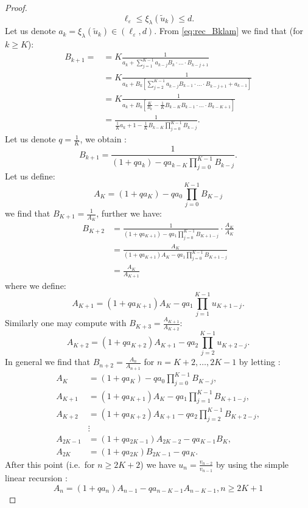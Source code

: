 \documentclass[12pt]{report}
\begin{document}
\begin{proof}
$$
\ell_\varepsilon \leq \xi_\lambda(\tilde u_k) \leq d.
$$
Let us denote $a_k=\xi_\lambda(\tilde{u}_k) \in (\ell_\varepsilon, d)$.
From \eqref{eq:rec_Bklam} we find that (for $k \geq K$):
\begin{align*}
B_{k+1}=
&=K \frac{1}{a_k + \sum_{j=1}^{K-1} a_{k-j} B_k \cdot \dots \cdot B_{k-j+1}}\\
&=K \frac{1}{a_k + B_k \left[ \sum_{j=2}^{K-1} a_{k-j} B_{k-1} \cdot \dots \cdot B_{k-j+1} + a_{k-1} \right]}\\
&=K \frac{1}{a_k + B_k \left[ \frac{K}{B_k} - \frac{1}{K} B_{k-K} B_{k-1} \cdot \dots \cdot B_{k-K+1} \right]}\\
&= \frac{1}{\frac{1}{K} a_k + 1 - \frac{1}{K} B_{k-K} \prod_{j=0}^{K-1} B_{k-j}}.
\end{align*}
Let us denote $q=\frac{1}{K}$, we obtain :
$$
B_{k+1} = \frac{1}{(1+q a_k) - q a_{k-K} \prod_{j=0}^{K-1} B_{k-j}}.
$$
Let us define: 
$$
A_K = (1+qa_K) - q a_0 \prod_{j=0}^{K-1} B_{K-j}
$$
we find that $B_{K+1} = \frac{1}{A_K}$, further we have:
\begin{align*}
B_{K+2}
&= \frac{1}{(1+q a_{K+1}) - qa_1 \prod_{j=0}^{K-1} B_{K+1-j}} \cdot \frac{A_K}{A_K}\\
&=\frac{A_K}{(1+q a_{K+1}) A_K - q a_1 \prod_{j=0}^{K-1} B_{K+1-j}}\\
&= \frac{A_K}{A_{K+1}}
\end{align*}
where we define:
$$
A_{K+1} = (1+q a_{K+1}) A_K - q a_1 \prod_{j=1}^{K-1} u_{K+1-j}.
$$
Similarly one may compute with $B_{K+3} = \frac{A_{K+1}}{A_{K+2}}$:
$$
A_{K+2}=(1+qa_{K+2})A_{K+1} - qa_2 \prod_{j=2}^{K-1} u_{K+2-j}.
$$
In general we find that $B_{n+2} = \frac{A_n}{A_{n+1}}$ for $n=K+2,\ldots, 2K-1$ by letting :
\begin{align*}
A_K  &= (1+q a_K) - q a_0 \prod_{j=0}^{K-1} B_{K-j},\\
A_{K+1} &= (1+qa_{K+1}) A_K - q a_1 \prod_{j=1}^{K-1} B_{K+1-j}, \\
A_{K+2} &= (1+qa_{K+2}) A_{K+1} - qa_2 \prod_{j=2}^{K-1} B_{K+2-j}, \\
& \vdots \\
A_{2K-1} &= (1+q a_{2K-1}) A_{2K-2} - q a_{K-1} B_K,\\
A_{2K} &= (1+qa_{2K}) B_{2K-1} - q a_K.
\end{align*}
After this point (i.e.~for $n \geq 2K+2$) we have $u_n = \frac{v_{n-2}}{v_{n-1}}$ by using the simple linear recursion :
\begin{equation}\label{eq:rec_A_n}
A_n = (1+qa_n) A_{n-1} - q a_{n-K-1} A_{n-K-1}, n \geq 2K+1

\end{equation}
\end{proof}
\end{document}
